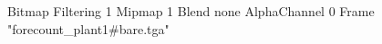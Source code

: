 {Bitmap
	{Filtering 1}
	{Mipmap 1}
	{Blend none}
	{AlphaChannel 0}
	{Frame "forecount_plant1#bare.tga"}
}

